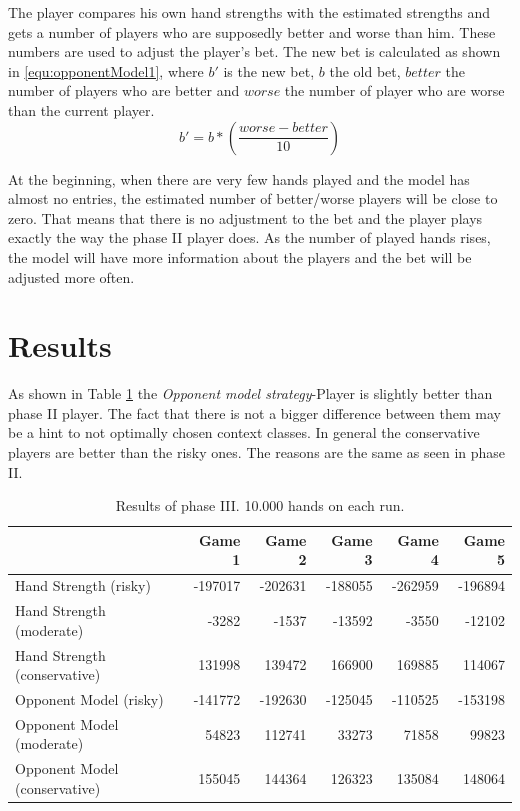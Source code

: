 The player compares his own hand strengths with the estimated strengths and gets a number of players who are supposedly better and worse than him. These numbers are used to adjust the player's bet. The new bet is calculated as shown in \ref{equ:opponentModel1}, where $b'$ is the new bet, $b$ the old bet, $better$ the number of players who are better and $worse$ the number of player who are worse than the current player.
\begin{equation}
	\label{equ:opponentModel1}
	b' = b * (\frac{worse - better}{10})
\end{equation}

At the beginning, when there are very few hands played and the model has almost no entries, the estimated number of better/worse players will be close to zero. That means that there is no adjustment to the bet and the player plays exactly the way the phase II player does. As the number of played hands rises, the model will have more information about the players and the bet will be adjusted more often.

\section{Results}
As shown in Table \ref{tbl:resultsPhase3a} the \emph{Opponent model strategy}-Player is slightly better than phase II player. The fact that there is not a bigger difference between them may be a hint to not optimally chosen context classes. In general the conservative players are better than the risky ones. The reasons are the same as seen in phase II.
\begin{table}[h]
	\centering
	\begin{tabular}[h]{l|r|r|r|r|r}
		& \textbf{Game 1} & \textbf{Game 2} & \textbf{Game 3} & \textbf{Game 4} & \textbf{Game 5}\\
		\hline
		Hand Strength (risky) & -197017 & -202631 & -188055 & -262959 & -196894\\
		Hand Strength (moderate) & -3282 & -1537 & -13592 & -3550 & -12102\\
		Hand Strength (conservative) & 131998 & 139472 & 166900 & 169885 & 114067\\
		Opponent Model (risky) & -141772 & -192630 & -125045 & -110525 & -153198\\
		Opponent Model (moderate) & 54823 & 112741 & 33273 & 71858 & 99823\\
		Opponent Model (conservative) & 155045 & 144364 & 126323 & 135084 & 148064\\
	\end{tabular}
	\label{tbl:resultsPhase3a}
	\caption{Results of phase III. 10.000 hands on each run.}
\end{table}


